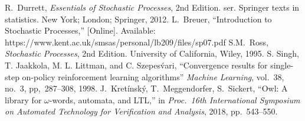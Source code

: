 \documentclass[10pt]{article}
\theoremstyle{definition}
\begin{document}
\begin{thebibliography}{99}
R.\ Durrett,
\textit{Essentials of Stochastic Processes}, 2nd Edition. ser. Springer texts in statistics. New York; London; Springer, 2012.
L.\ Breuer,
``Introduction to Stochastic Processes,'' [Online]. Available: https://www.kent.ac.uk/smsas/personal/lb209/files/sp07.pdf
S.M.\ Ross,
\textit{Stochastic Processes}, 2nd Edition. University of California, Wiley, 1995.
S. Singh, T. Jaakkola, M. L. Littman, and C. Szepes\'{v}ari,
``Convergence results for single-step on-policy reinforcement learning algorithms'' \textit{Machine Learning},
vol.~38, no.~3, pp,~287--308, 1998.
J.~Kretínsk\'{y}, T.~Meggendorfer, S.~Sickert, ``Owl: A library for $\omega$-words, automata,
and LTL,'' in \textit{Proc.~16th International Symposium on Automated Technology for Verification and Analysis}, 2018,  pp.~543–550.

\end{thebibliography}
\end{document}
